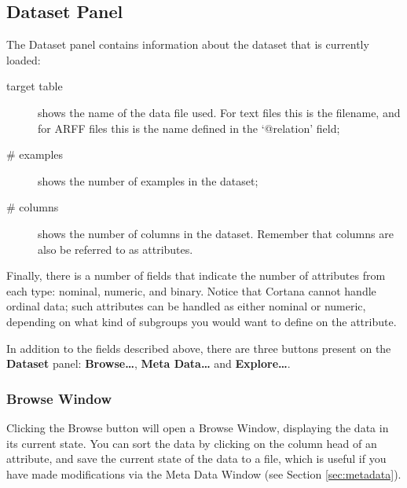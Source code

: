 \documentclass{article}
\begin{document}
\subsection{Dataset Panel}
\label{sec:dataset}


The Dataset panel contains information about the dataset that is currently
loaded:
\begin{description}
\item[target table] shows the name of the data file used. For text
files this is the filename, and for ARFF files this is the name defined in the
`@relation' field;
\item[\# examples] shows the number of examples in the dataset;
\item[\# columns] shows the number of columns in the dataset.
Remember that columns are also be referred to as attributes.
\end{description}
Finally, there is a number of fields that indicate the number of attributes
from each \gls{type}: \gls{nominal}, \gls{numeric}, and \gls{binary}. Notice
that Cortana cannot handle \gls{ordinal} data; such attributes can be
handled as either \gls{nominal} or \gls{numeric}, depending on what kind of
subgroups you would want to define on the attribute.

In addition to the fields described above, there are three buttons present
on the {\bf Dataset} panel: {\bf Browse\ldots}, {\bf Meta Data\ldots} and
{\bf Explore\ldots}.

\subsubsection{Browse Window}
\label{sec:browsewindow}

Clicking the Browse button will open a Browse Window, displaying the
data in its current state.  You can sort the data by clicking on the column
head of an attribute, and save the current state of the data to a file,
which is useful if you have made modifications via the Meta Data Window (see
Section \ref{sec:metadata}).

\end{document}
